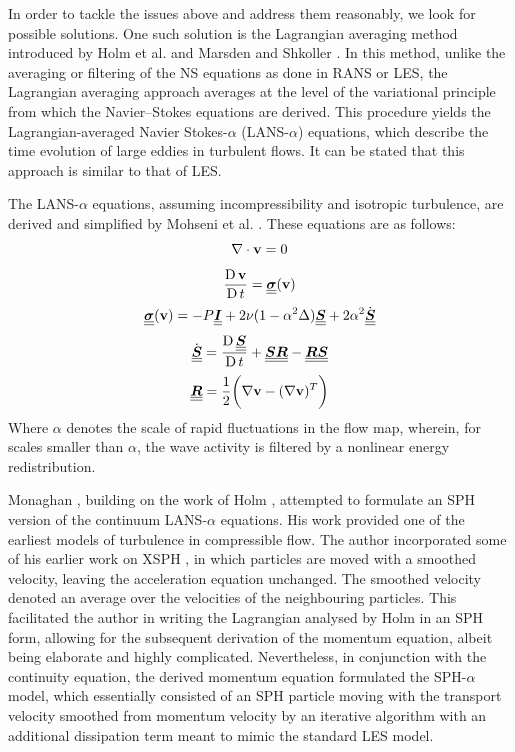 In order to tackle the issues above and address them reasonably, we look for possible solutions. One such solution is the Lagrangian averaging method introduced by Holm et al. \parencite{holm1998euler} and Marsden and Shkoller \parencite{Marsden2001}. In this method, unlike the averaging or filtering of the NS equations as done in RANS or LES, the Lagrangian averaging approach averages at the level of the variational principle from which the Navier–Stokes equations are derived. This procedure yields the Lagrangian-averaged Navier Stokes-$\alpha$ (LANS-$\alpha$) equations, which describe the time evolution of large eddies in turbulent flows. It can be stated that this approach is similar to that of LES.

The LANS-$\alpha$ equations, assuming incompressibility and isotropic turbulence, are derived and simplified by Mohseni et al. \parencite{Mohseni2003}. These equations are as follows:
\begin{equation}
	\nabla \cdot \mathbf{v} = 0
\end{equation}
\begin{equation}
	\frac{\operatorname{D} \mathbf{v}}{\operatorname{D} t} = \underline{\underline{\bm{\sigma}}}(\mathbf{v})
\end{equation}
\begin{equation}
	\underline{\underline{\bm{\sigma}}}(\mathbf{v}) = -P\underline{\underline{\bm{I}}} + 2\nu(1 - \alpha^2\Delta)\underline{\underline{\bm{S}}} + 2\alpha^2\Dot{\underline{\underline{\bm{S}}}}
\end{equation}
\begin{equation}
	\Dot{\underline{\underline{\bm{S}}}} = \frac{\operatorname{D} \underline{\underline{\bm{S}}}}{\operatorname{D} t} + \underline{\underline{\bm{S}}}\underline{\underline{\bm{R}}} - \underline{\underline{\bm{R}}}\underline{\underline{\bm{S}}}
\end{equation}
\begin{equation}
	\underline{\underline{\bm{R}}} = \frac{1}{2}\bigg(\nabla\mathbf{v}-(\nabla\mathbf{v})^T\bigg)
\end{equation}
Where $\alpha$ denotes the scale of rapid fluctuations in the flow map, wherein, for scales smaller than $\alpha$, the wave activity is filtered by a nonlinear energy redistribution.

Monaghan \parencite{Monaghan2002}, building on the work of Holm \parencite{holm1998euler}, attempted to formulate an SPH version of the continuum LANS-$\alpha$ equations. His work provided one of the earliest models of turbulence in compressible flow. The author incorporated some of his earlier work on XSPH \parencite{monaghan1989problem}, in which particles are moved with a smoothed velocity, leaving the acceleration equation unchanged. The smoothed velocity denoted an average over the velocities of the neighbouring particles. This facilitated the author in writing the Lagrangian analysed by Holm in an SPH form, allowing for the subsequent derivation of the momentum equation, albeit being elaborate and highly complicated. Nevertheless, in conjunction with the continuity equation, the derived momentum equation formulated the SPH-$\alpha$ model, which essentially consisted of an SPH particle moving with the transport velocity smoothed from momentum velocity by an iterative algorithm with an additional dissipation term meant to mimic the standard LES model.

